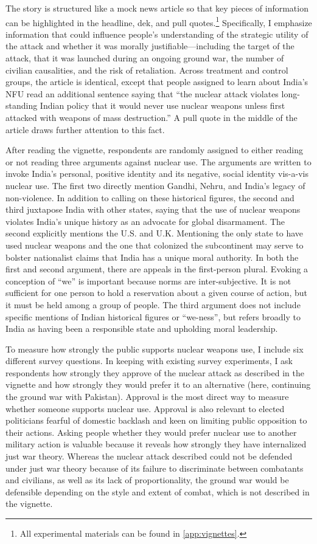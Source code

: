 \documentclass[12pt]{article}
\begin{document}
The story is structured like a mock news article so that key pieces of information can be highlighted in the headline, dek, and pull quotes.\footnote{All experimental materials can be found in  \autoref{app:vignettes}.} Specifically, I emphasize information that could influence people's understanding of the strategic utility of the attack and whether it was morally justifiable—including the target of the attack, that it was launched during an ongoing ground war, the number of civilian causalities, and the risk of retaliation. Across treatment and control groups, the article is identical, except that people assigned to learn about India's NFU read an additional sentence saying that “the nuclear attack violates long-standing Indian policy that it would never use nuclear weapons unless first attacked with weapons of mass destruction.” A pull quote in the middle of the article draws further attention to this fact.

After reading the vignette, respondents are randomly assigned to either reading or not reading three arguments against nuclear use. The arguments are written to invoke India's personal, positive identity and its negative, social identity vis-a-vis nuclear use. The first two directly mention Gandhi, Nehru, and India's legacy of non-violence. In addition to calling on these historical figures, the second and third juxtapose India with other states, saying that the use of nuclear weapons violates India's unique history as an advocate for global disarmament. The second explicitly mentions the U.S. and U.K. Mentioning the only state to have used nuclear weapons and the one that colonized the subcontinent may serve to bolster nationalist claims that India has a unique moral authority. In both the first and second argument, there are appeals in the first-person plural. Evoking a conception of “we” is important because norms are inter-subjective. It is not sufficient for one person to hold a reservation about a given course of action, but it must be held among a group of people. The third argument does not include specific mentions of Indian historical figures or “we-ness”, but refers broadly to India as having been a responsible state and upholding moral leadership. 

To measure how strongly the public supports nuclear weapons use, I include six different survey questions. In keeping with existing survey experiments, I ask respondents how strongly they approve of the nuclear attack as described in the vignette and how strongly they would prefer it to an alternative (here, continuing the ground war with Pakistan). Approval is the most direct way to measure whether someone supports nuclear use. Approval is also relevant to elected politicians fearful of domestic backlash and keen on limiting public opposition to their actions. Asking people whether they would prefer nuclear use to another military action is valuable because it reveals how strongly they have internalized just war theory. Whereas the nuclear attack described could not be defended under just war theory because of its failure to discriminate between combatants and civilians, as well as its lack of proportionality, the ground war would be defensible depending on the style and extent of combat, which is not described in the vignette. 
\end{document}
